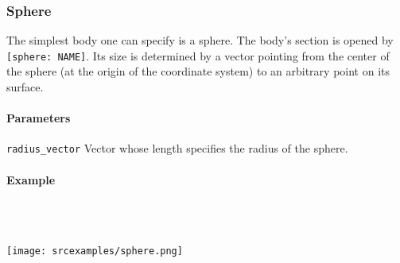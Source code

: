 \subsubsection{Sphere}
The simplest body one can specify is a sphere. The body's section is opened by \lstinline{[sphere: NAME]}. Its size is determined by a  vector pointing from the center of the sphere (at the origin of the coordinate system) to an arbitrary point on its surface.

\paragraph{Parameters}
\begin{description}
 \item{\lstinline{radius_vector}} Vector whose length specifies the radius of the sphere.
\end{description}

\paragraph{Example}\ 


\ \\\texttt{[image: srcexamples/sphere.png]}